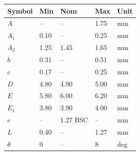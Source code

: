 
\begin{center}
\begin{tabular}{@{}C{1.6cm}C{2.0cm}C{2.0cm}C{2.0cm}C{1.6cm}@{}}
\toprule
{}
{\footnotesize\bfseries Symbol} & {\footnotesize\bfseries Min} & {\footnotesize\bfseries Nom} & {\footnotesize\bfseries Max} & {\footnotesize\bfseries Unit} \\
\midrule
$A$        & --    & --    & 1.75 & mm \\
$A_1$      & 0.10  & --    & 0.25 & mm \\
$A_2$      & 1.25  & 1.45  & 1.65 & mm \\
$b$        & 0.31  & --    & 0.51 & mm \\
$c$        & 0.17  & --    & 0.25 & mm \\
$D$        & 4.80  & 4.90  & 5.00 & mm \\
$E$        & 5.80  & 6.00  & 6.20 & mm \\
$E_1$      & 3.80  & 3.90  & 4.00 & mm \\
$e$        & --    & 1.27 BSC   & --   & mm \\
$L$        & 0.40  & --    & 1.27 & mm \\
$\theta$   & 0     & --    & 8    & deg \\
\bottomrule
\end{tabular}
\end{center}

